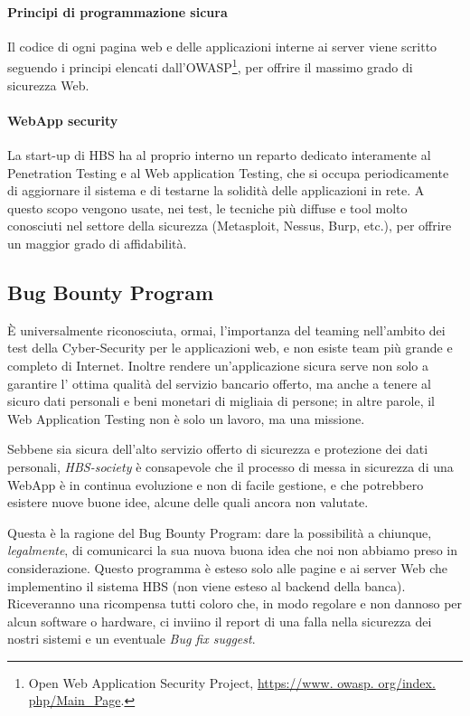 \paragraph{Principi di programmazione sicura}
Il codice di ogni pagina web e delle applicazioni interne ai server viene scritto seguendo i principi elencati dall'OWASP\footnote{Open Web Application Security Project, \url{https://www. owasp. org/index. php/Main_Page}.}, per offrire il massimo grado di sicurezza Web.

\paragraph{WebApp security}
La start-up di HBS ha al proprio interno un reparto dedicato interamente al Penetration Testing e al Web application Testing, che si occupa periodicamente di aggiornare il sistema e di testarne la solidità delle applicazioni in rete.
A questo scopo vengono usate, nei test, le tecniche più diffuse e tool molto conosciuti nel settore della sicurezza (Metasploit, Nessus, Burp, etc.), per offrire un maggior grado di affidabilità.





\subsection{Bug Bounty Program}
\`E universalmente riconosciuta, ormai, l'importanza del teaming nell'ambito dei test della Cyber-Security per le applicazioni web, e non esiste team più grande e completo di Internet. Inoltre rendere un'applicazione sicura serve non solo a garantire l' ottima qualità del servizio bancario offerto, ma anche a tenere al sicuro dati personali e beni monetari di migliaia di persone; in altre parole, il Web Application Testing non è solo un lavoro, ma una missione.

Sebbene sia sicura dell'alto servizio offerto di sicurezza e protezione dei dati personali, \emph{HBS-society} è consapevole che il processo di messa in sicurezza di una WebApp è in continua evoluzione e non di facile gestione, e che potrebbero esistere nuove buone idee, alcune delle quali ancora non valutate.

Questa è la ragione del Bug Bounty Program: dare la possibilità a chiunque, \emph{legalmente}, di comunicarci la sua nuova buona idea che noi non abbiamo preso in considerazione. Questo programma è esteso solo alle pagine e ai server Web che implementino il sistema HBS (non viene esteso al backend della banca). Riceveranno una ricompensa tutti coloro che, in modo regolare e non dannoso per alcun software o hardware, ci inviino il report di una falla nella sicurezza dei nostri sistemi e un eventuale \emph{Bug fix suggest}.
